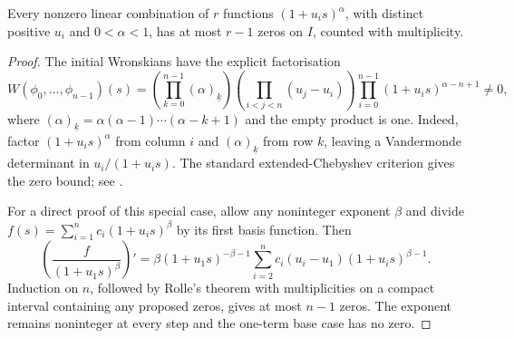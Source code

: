 \begin{lemma}\label{mc:chebyshev}
Every nonzero linear combination of $r$ functions $(1+u_is)^\alpha$, with distinct positive $u_i$ and $0<\alpha<1$, has at most $r-1$ zeros on $I$, counted with multiplicity.
\end{lemma}
\begin{proof}
The initial Wronskians have the explicit factorisation
\begin{equation}\label{mc:wronskian}
 W(\phi_0,\ldots,\phi_{n-1})(s)
 =\left(\prod_{k=0}^{n-1}(\alpha)_{\underline{k}}\right)
 \left(\prod_{i<j<n}(u_j-u_i)\right)
 \prod_{i=0}^{n-1}(1+u_is)^{\alpha-n+1}\ne0,
\end{equation}
where $(\alpha)_{\underline{k}}=\alpha(\alpha-1)\cdots(\alpha-k+1)$ and the empty product is one. Indeed, factor $(1+u_is)^\alpha$ from column $i$ and $(\alpha)_{\underline{k}}$ from row $k$, leaving a Vandermonde determinant in $u_i/(1+u_is)$. The standard extended-Chebyshev criterion gives the zero bound; see \cite[Theorem 2.1]{GLT2012}.

For a direct proof of this special case, allow any noninteger exponent $\beta$ and divide $f(s)=\sum_{i=1}^n c_i(1+u_is)^\beta$ by its first basis function. Then
\begin{equation}
 \left(\frac{f}{(1+u_1s)^\beta}\right)'
 =\beta(1+u_1s)^{-\beta-1}
 \sum_{i=2}^n c_i(u_i-u_1)(1+u_is)^{\beta-1}.
\end{equation}
Induction on $n$, followed by Rolle's theorem with multiplicities on a compact interval containing any proposed zeros, gives at most $n-1$ zeros. The exponent remains noninteger at every step and the one-term base case has no zero.
\end{proof}

